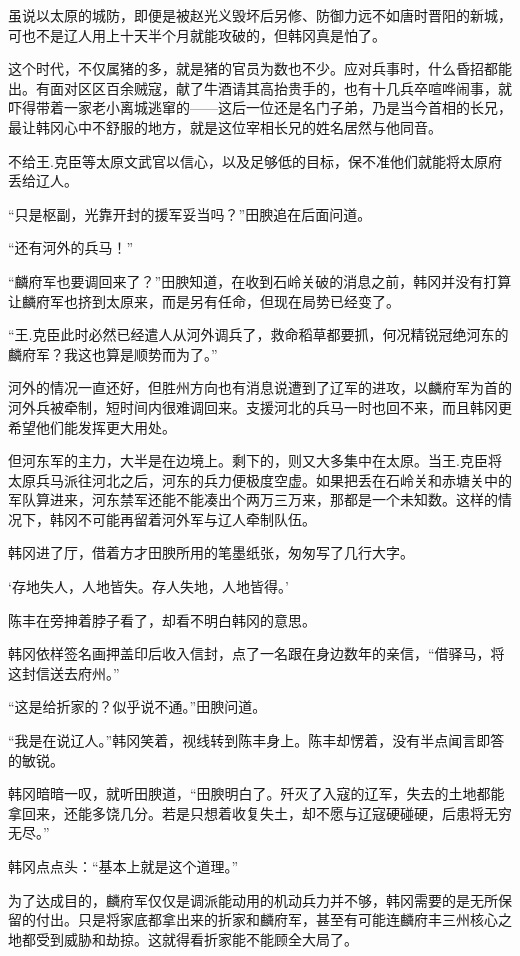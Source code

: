 虽说以太原的城防，即便是被赵光义毁坏后另修、防御力远不如唐时晋阳的新城，可也不是辽人用上十天半个月就能攻破的，但韩冈真是怕了。

这个时代，不仅属猪的多，就是猪的官员为数也不少。应对兵事时，什么昏招都能出。有面对区区百余贼寇，献了牛酒请其高抬贵手的，也有十几兵卒喧哗闹事，就吓得带着一家老小离城逃窜的——这后一位还是名门子弟，乃是当今首相的长兄，最让韩冈心中不舒服的地方，就是这位宰相长兄的姓名居然与他同音。

不给王.克臣等太原文武官以信心，以及足够低的目标，保不准他们就能将太原府丢给辽人。

“只是枢副，光靠开封的援军妥当吗？”田腴追在后面问道。

“还有河外的兵马！”

“麟府军也要调回来了？”田腴知道，在收到石岭关破的消息之前，韩冈并没有打算让麟府军也挤到太原来，而是另有任命，但现在局势已经变了。

“王.克臣此时必然已经遣人从河外调兵了，救命稻草都要抓，何况精锐冠绝河东的麟府军？我这也算是顺势而为了。”

河外的情况一直还好，但胜州方向也有消息说遭到了辽军的进攻，以麟府军为首的河外兵被牵制，短时间内很难调回来。支援河北的兵马一时也回不来，而且韩冈更希望他们能发挥更大用处。

但河东军的主力，大半是在边境上。剩下的，则又大多集中在太原。当王.克臣将太原兵马派往河北之后，河东的兵力便极度空虚。如果把丢在石岭关和赤塘关中的军队算进来，河东禁军还能不能凑出个两万三万来，那都是一个未知数。这样的情况下，韩冈不可能再留着河外军与辽人牵制队伍。

韩冈进了厅，借着方才田腴所用的笔墨纸张，匆匆写了几行大字。

‘存地失人，人地皆失。存人失地，人地皆得。’

陈丰在旁抻着脖子看了，却看不明白韩冈的意思。

韩冈依样签名画押盖印后收入信封，点了一名跟在身边数年的亲信，“借驿马，将这封信送去府州。”

“这是给折家的？似乎说不通。”田腴问道。

“我是在说辽人。”韩冈笑着，视线转到陈丰身上。陈丰却愣着，没有半点闻言即答的敏锐。

韩冈暗暗一叹，就听田腴道，“田腴明白了。歼灭了入寇的辽军，失去的土地都能拿回来，还能多饶几分。若是只想着收复失土，却不愿与辽寇硬碰硬，后患将无穷无尽。”

韩冈点点头：“基本上就是这个道理。”

为了达成目的，麟府军仅仅是调派能动用的机动兵力并不够，韩冈需要的是无所保留的付出。只是将家底都拿出来的折家和麟府军，甚至有可能连麟府丰三州核心之地都受到威胁和劫掠。这就得看折家能不能顾全大局了。

